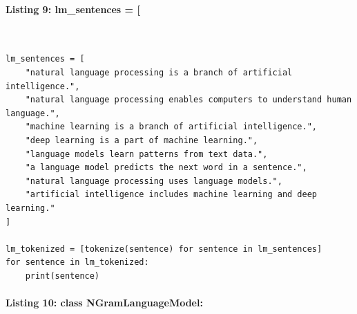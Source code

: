 \documentclass[12pt,a4paper,oneside]{report}
\begin{document}
\paragraph{Listing 9: lm\_sentences = [}\mbox{}\\[-1ex]
\begin{Verbatim}[commandchars=\\\{\},breaklines=true,breakanywhere=true,fontsize=\scriptsize,frame=leftline,framesep=2mm,rulecolor=\color{gray}]
lm_sentences = [
    "natural language processing is a branch of artificial intelligence.",
    "natural language processing enables computers to understand human language.",
    "machine learning is a branch of artificial intelligence.",
    "deep learning is a part of machine learning.",
    "language models learn patterns from text data.",
    "a language model predicts the next word in a sentence.",
    "natural language processing uses language models.",
    "artificial intelligence includes machine learning and deep learning."
]

lm_tokenized = [tokenize(sentence) for sentence in lm_sentences]
for sentence in lm_tokenized:
    print(sentence)
\end{Verbatim}
\paragraph{Listing 10: class NGramLanguageModel:}\mbox{}\\[-1ex]
\end{document}
